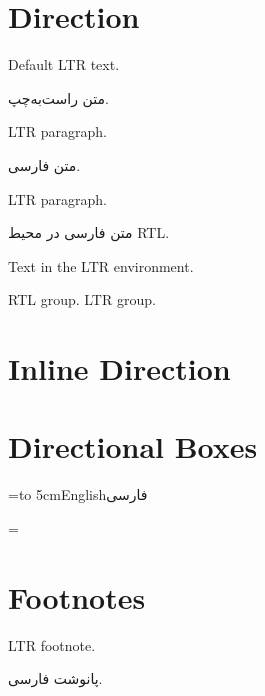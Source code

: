 \documentclass{article}
\makeatletter
\newcommand{\AssertRTL}{%
    \if@RTL\else
    \PackageError{api-luatex}{Expected RTL direction}{}
    \fi
}
\newcommand{\AssertLTR}{%
    \if@RTL
    \PackageError{api-luatex}{Expected LTR direction}{}
    \fi
}
\makeatother
\begin{document}
    \section*{Direction}

    Default LTR text.
    \AssertLTR

    \setRTL
    \AssertRTL
    متن راست‌به‌چپ.

    \setLTR
    \AssertLTR
    LTR paragraph.

    \setRL
    \AssertRTL
    متن فارسی.

    \unsetLTR
    \AssertRTL

    \setLR
    \AssertLTR
    LTR paragraph.

    \unsetRTL
    \AssertLTR

    \begin{RTL}
        \AssertRTL
        متن فارسی در محیط RTL.
    \end{RTL}
    \AssertLTR

    \begin{LTR}
        \AssertLTR
        Text in the LTR environment.
    \end{LTR}
    \AssertLTR

    \beginR RTL group. \endR
    \beginL LTR group. \endL

    \section*{Inline Direction}

     

     

    \section*{Directional Boxes}


    \medskip


    \medskip


    \medskip

    =\hboxL to 5cm{English\hfil فارسی}

    =

    \section*{Footnotes}

    LTR footnote.

    پانوشت فارسی.
\end{document}
